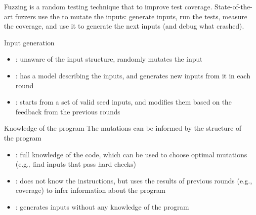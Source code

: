 \begin{parag}{Fuzzing}
     is a random testing technique that  to improve test coverage. State-of-the-art fuzzers use the  to mutate the inputs: generate inputs, run the tests, measure the coverage, and use it to generate the next inputs (and debug what crashed).
    \begin{subparag}{Input generation}
        \begin{itemize}
            \item {}: unaware of the input structure, randomly mutates the input
            \item {}: has a model describing the inputs, and generates new inputs from it in each round
            \item {}: starts from a set of valid seed inputs, and modifies them based on the feedback from the previous rounds
        \end{itemize}
    \end{subparag}
    \begin{subparag}{Knowledge of the program}
        The mutations can be informed by the structure of the program
        \begin{itemize}
            \item {}: full knowledge of the code, which can be used to choose optimal mutations (e.g., find inputs that pass hard checks)
            \item {}: does not know the instructions, but uses the results of previous rounds (e.g., coverage) to infer information about the program
            \item {}: generates inputs without any knowledge of the program
        \end{itemize}
    \end{subparag}
\end{parag}

